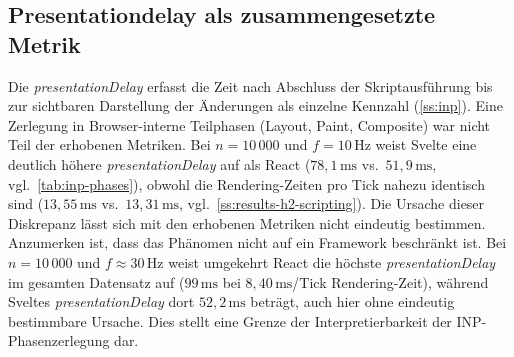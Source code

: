 \subsection{Presentationdelay als zusammengesetzte Metrik}
Die \textit{presentationDelay} erfasst die Zeit nach Abschluss der Skriptausführung bis zur sichtbaren Darstellung der Änderungen als einzelne Kennzahl (\cref{ss:inp}). Eine Zerlegung in Browser-interne Teilphasen (Layout, Paint, Composite) war nicht Teil der erhobenen Metriken. Bei $n = 10\,000$ und $f = 10\,\text{Hz}$ weist Svelte eine deutlich höhere \textit{presentationDelay} auf als React ($78{,}1\,\text{ms}$ vs.\ $51{,}9\,\text{ms}$, vgl.~\cref{tab:inp-phases}), obwohl die Rendering-Zeiten pro Tick nahezu identisch sind ($13{,}55\,\text{ms}$ vs.\ $13{,}31\,\text{ms}$, vgl.~\cref{ss:results-h2-scripting}). Die Ursache dieser Diskrepanz lässt sich mit den erhobenen Metriken nicht eindeutig bestimmen. Anzumerken ist, dass das Phänomen nicht auf ein Framework beschränkt ist. Bei $n = 10\,000$ und $f \approx 30\,\text{Hz}$ weist umgekehrt React die höchste \textit{presentationDelay} im gesamten Datensatz auf ($99\,\text{ms}$ bei $8{,}40\,\text{ms}$/Tick Rendering-Zeit), während Sveltes \textit{presentationDelay} dort $52{,}2\,\text{ms}$ beträgt, auch hier ohne eindeutig bestimmbare Ursache. Dies stellt eine Grenze der Interpretierbarkeit der INP-Phasenzerlegung dar.
